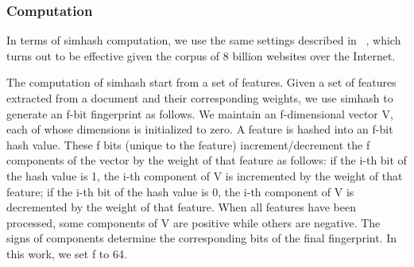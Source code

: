 

%

\subsubsection{Computation}
In terms of simhash computation, we use the same settings described in 
~\cite{manku2007detecting}, which turns out to be effective given the corpus of
8 billion websites over the Internet.

The computation of simhash start from a set of features.
Given a set of features extracted from a document and their corresponding
weights, we use simhash to generate an f-bit fingerprint as follows.
We maintain an f-dimensional vector V, each of whose dimensions is initialized to zero.
A feature is hashed into an f-bit hash value. These f bits (unique to the
feature) increment/decrement the f components of the vector by the weight of
that feature as follows: if the i-th bit of the hash value is 1, the i-th component
of V is incremented by the weight of that feature; if the i-th bit of the
hash value is 0, the i-th component of V is decremented by the weight of that
feature. When all features have been processed, some components of V are
positive while others are negative. The signs of components determine the
corresponding bits of the final fingerprint. In this work, we set f to 64.

